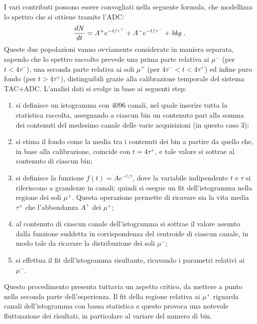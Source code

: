 \documentclass[10pt, oneside, a4paper]{article}   	%
\begin{document}
I vari contributi possono essere convogliati nella seguente formula, che modellizza lo spettro che si ottiene tramite l'ADC:
 \[  \frac{dN}{dt} = A^+ e^{-t/\tau^+} + A^- e^{-t/\tau^-} + \mbox{\emph{bkg\;.}} \]
Queste due popolazioni vanno ovviamente considerate in maniera separata, sapendo che lo spettro raccolto prevede una prima parte relativa ai $\mu^-$ (per $t<4\tau^-$), una seconda parte relativa ai soli $\mu^+$ (per $4\tau^-<t<4\tau^+$) ed infine puro fondo (per $t>4\tau^+$), distinguibili grazie alla calibrazione temporale del sistema TAC+ADC.
L'analisi dati si svolge in base ai seguenti step:
\begin{enumerate}
	\item si definisce un istogramma con 4096 canali, nel quale inserire tutta la statistica raccolta, assegnando a ciascun bin un contenuto pari alla somma dei contenuti del medesimo canale delle varie acquisizioni (in questo caso 3);
	\item si stima il fondo come la media tra i contenuti dei bin a partire da quello che, in base alla calibrazione, coincide con $t=4\tau^+$, e tale valore si sottrae al contenuto di ciascun bin;
	\item si definisce la funzione $f(t)=Ae^{-t/\tau}$, dove la variabile indipendente $t$ e $\tau$ si riferiscono a grandezze in canali; quindi si esegue un fit dell'istogramma nella regione dei soli $\mu^+$. Questa operazione permette di ricavare sia la vita media $\tau^+$ che l'abbondanza $A^+$ dei $\mu^+$; 
	\item al contenuto di ciascun canale dell'istogramma si sottrae il valore assunto dalla funzione suddetta in corrispondenza del centroide di ciascun canale, in modo tale da ricavare la distribuzione dei soli $\mu^-$;
	\item si effettua il fit dell'istogramma risultante, ricavando i parametri relativi ai $\mu^-$.
\end{enumerate}
Questo procedimento presenta tuttavia un aspetto critico, da mettere a punto nella seconda parte dell'esperienza. 
Il fit della regione relativa ai $\mu^+$ riguarda canali dell'istogramma con bassa statistica e questo provoca una notevole fluttuazione dei risultati, in particolare al variare del numero di bin. 
\end{document}
